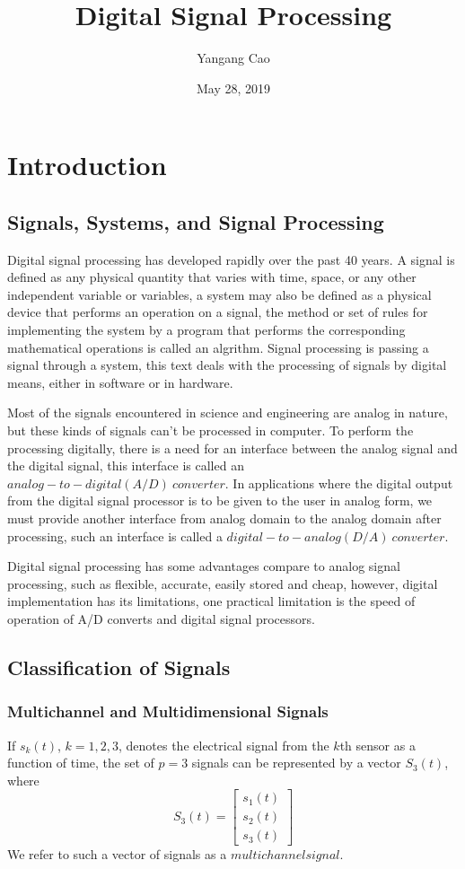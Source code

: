\documentclass[10pt,a4paper,oneside]{article}
\author{Yangang Cao}
\date{May 28, 2019}
\begin{document}
\title{Digital Signal Processing}
\maketitle 
\section{Introduction}
\subsection{Signals, Systems, and Signal Processing}
Digital signal processing has developed rapidly over the past 40 years. A signal is defined as any physical quantity that varies with time, space, or any other independent variable or variables, a system may also be defined as a physical device that performs an operation on a signal, the method or set of rules for implementing the system by a program that performs the corresponding mathematical operations is called an algrithm. Signal processing is passing a signal through a system, this text deals with the processing of signals by digital means, either in software or in hardware.

Most of the signals encountered in science and engineering are analog in nature, but these kinds of signals can't be processed in computer. To perform the processing digitally, there is a need for an interface between the analog signal and the digital signal, this interface is called an $analog-to-digital(A/D) \ converter$. In applications where the digital output from the digital signal processor is to be given to the user in analog form, we must provide another interface from analog domain to the analog domain after processing, such an interface is called a $digital-to-analog(D/A) \ converter$. 

Digital signal processing has some advantages compare to analog signal processing, such as flexible, accurate, easily stored and cheap, however, digital implementation has its limitations, one practical limitation is the speed of operation of A/D converts and digital signal processors.
\subsection{Classification of Signals}
\subsubsection{Multichannel and Multidimensional Signals}
If $s_k(t)$, $k=1, 2, 3$, denotes the electrical signal from the $k$th sensor as a function of time, the set of $p=3$ signals can be represented by a vector $S_3(t)$, where
\[
S_3(t) = \begin{bmatrix} s_1(t)\\s_2(t)\\s_3(t) \end{bmatrix}
\]
We refer to such a vector of signals as a $multichannel signal$.
\end{document}
